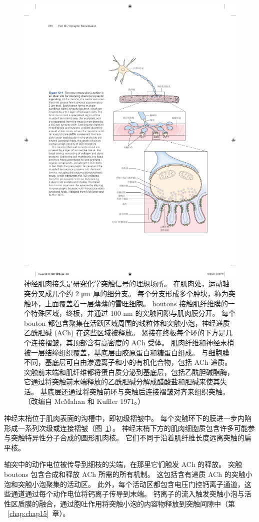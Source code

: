 \begin{figure}[htbp]
	\centering
	\includegraphics[width=0.6\linewidth]{chap12/fig_12_1}
	\caption{神经肌肉接头是研究化学突触信号的理想场所。 在肌肉处，运动轴突分叉成几个约 2 μm 厚的细分支。 每个分支形成多个肿块，称为突触环，上面覆盖着一层薄薄的雪旺细胞。 boutons 接触肌纤维膜的一个特殊区域，终板，并通过 100 nm 的突触间隙与肌肉膜分开。 每个 bouton 都包含聚集在活跃区域周围的线粒体和突触小泡，神经递质乙酰胆碱 (ACh) 在这些区域被释放。 紧接在终板每个环的下方是几个连接褶皱，其顶部含有高密度的 ACh 受体。 肌肉纤维和神经末梢被一层结缔组织覆盖，基底层由胶原蛋白和糖蛋白组成。 与细胞膜不同，基底层可自由渗透离子和小的有机化合物，包括 ACh 递质。 突触前末端和肌纤维都将蛋白质分泌到基底层，包括乙酰胆碱酯酶，它通过将突触前末端释放的乙酰胆碱分解成醋酸盐和胆碱来使其失活。 基底层还通过将突触前环与突触后连接褶皱对齐来组织突触。 （改编自 McMahan 和 Kuffler 1971。）}
	\label{fig:12_1}
\end{figure}


神经末梢位于肌肉表面的沟槽中，即初级褶皱中。
每个突触环下的膜进一步内陷形成一系列次级或连接褶皱（图~\ref{fig:12_1}）。
神经末梢下方的肌肉细胞质包含许多可能参与突触特异性分子合成的圆形肌肉核。
它们不同于沿着肌纤维长度远离突触的扁平核。


轴突中的动作电位被传导到细枝的尖端，在那里它们触发 ACh 的释放。
突触 boutons 包含合成和释放 ACh 所需的所有机制。
这包括含有递质 ACh 的突触小泡和突触小泡聚集的活动区。
此外，每个活动区都包含电压门控钙离子通道，这些通道通过每个动作电位将钙离子传导到末端。
钙离子的流入触发突触小泡与活性区质膜的融合，通过胞吐作用将突触小泡的内容物释放到突触间隙中（第 ~\ref{chap:chap15}~章）。


